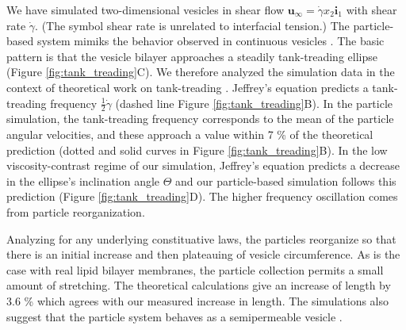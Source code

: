 We have simulated two-dimensional vesicles in shear flow 
$\mathbf{u}_{\infty} = \dot{\gamma} x_2 \mathbf{i}_1$ with shear rate $\dot{\gamma}$.
(The symbol shear rate is unrelated to interfacial tension.)
The particle-based system mimiks the behavior observed in continuous vesicles
\cite{torres-sanchez_millan_arroyo_2019, mahapatra_saintillan_rangamani_2020, 
  Steigmann99, C6SM02452A}.
The basic pattern is that the vesicle bilayer approaches a steadily 
tank-treading ellipse (Figure \ref{fig:tank_treading}C).
We therefore analyzed the simulation data in the context of
theoretical work on tank-treading \cite{Finken2008}. 
Jeffrey's equation predicts a tank-treading frequency $\tfrac{1}{2}\dot{\gamma}$
(dashed line Figure \ref{fig:tank_treading}B).
In the particle simulation, the tank-treading frequency corresponds to the mean
of the particle angular velocities, and these approach a value within 7 \% of
the theoretical prediction (dotted and solid curves in Figure \ref{fig:tank_treading}B).
In the low viscosity-contrast regime of our simulation, Jeffrey's equation predicts
a decrease in the ellipse's inclination angle $\Theta$
and our particle-based simulation follows this prediction
(Figure \ref{fig:tank_treading}D). The higher frequency oscillation comes
from particle reorganization.

Analyzing for any underlying constituative laws, the particles
reorganize so that there is an initial increase and then plateauing of vesicle circumference.
As is the case with real lipid bilayer membranes, the particle collection permits a small amount of stretching. 
The theoretical calculations give an increase of length by 3.6 \% which
agrees with our measured increase in length. The simulations also suggest
that the particle system behaves as a semipermeable vesicle \cite{323e9a2f0c58487ea82518d7a1f96485,YAO2017728}.

